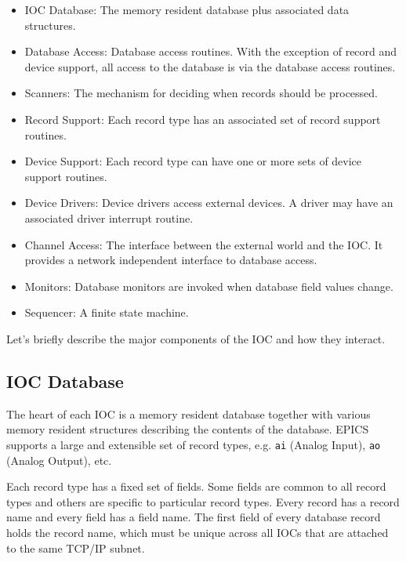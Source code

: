 \begin{itemize}\item IOC Database: The memory resident database plus associated data structures.

\item Database Access:  Database access routines. With the exception of record and device support, all access to the 
database is via the database access routines.

\item Scanners:  The mechanism for deciding when records should be processed.

\item Record Support:  Each record type has an associated set of record support routines.

\item Device Support: Each record type can have one or more sets of device support routines.

\item Device Drivers:  Device drivers access external devices. A driver may have an associated driver interrupt routine.

\item Channel Access:  The interface between the external world and the IOC. It provides a network independent 
interface to database access.

\item Monitors:  Database monitors are invoked when database field values change.

\item Sequencer:  A finite state machine.

\end{itemize}Let's briefly describe the major components of the IOC and how they interact.

\subsection{IOC Database}

The heart of each IOC is a memory resident database together with various memory resident structures describing the 
contents of the database. EPICS supports a large and extensible set of record types, e.g. \verb|ai| (Analog Input), \verb|ao| (Analog 
Output), etc.

Each record type has a fixed set of fields. Some fields are common to all record types and others are specific to particular 
record types. Every record has a record name and every field has a field name. The first field of every database record 
holds the record name, which must be unique across all IOCs that are attached to the same TCP/IP subnet.

